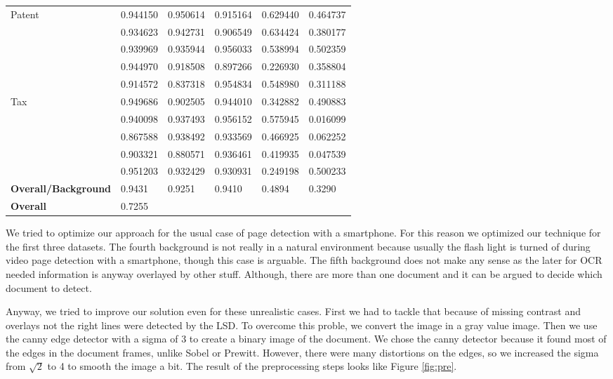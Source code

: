 \documentclass[english, paper=a4]{scrartcl}
\begin{document}
\begin{table*}[]
\begin{tabular}{l | p{2cm}| p{2cm}| p{2cm}| p{2cm}| p{2cm} }
Patent & 0.944150 & 0.950614  &0.915164 &0.629440 &0.464737  \\   
		& 0.934623 & 0.942731  &0.906549 &0.634424 &0.380177  \\ 
		& 0.939969 & 0.935944  &0.956033 &0.538994 &0.502359  \\ 
		& 0.944970 & 0.918508  &0.897266 &0.226930 &0.358804  \\ 
		& 0.914572 & 0.837318  &0.954834 &0.548980 &0.311188  \\ \hline 
Tax & 0.949686 & 0.902505  &0.944010 &0.342882 &0.490883  \\   
		& 0.940098 & 0.937493  &0.956152 &0.575945 &0.016099  \\ 
		& 0.867588 & 0.938492  &0.933569 &0.466925 &0.062252  \\ 
		& 0.903321 & 0.880571  &0.936461 &0.419935 &0.047539  \\ 
		& 0.951203 & 0.932429  &0.930931 &0.249198 &0.500233  \\ 	\hline \hline 
\textbf{Overall/Background} &0.9431 & 0.9251 & 0.9410 & 0.4894 &0.3290\\ \hline 
\textbf{Overall}&	 0.7255					            
\end{tabular}
\label{tab:results}
\end{table*}

We tried to optimize our approach for the usual case of page detection
with a smartphone. For this reason we optimized our technique for the first three
datasets. 
The fourth background is not really in a natural environment because usually 
the flash light is turned of during video page detection with a smartphone,
though this case is arguable. 
The fifth background does not make any sense as the later for OCR needed
information is anyway overlayed by other stuff. Although, there are more
than one document and it can be argued to decide which document to detect.

Anyway, we tried to improve our solution even for these unrealistic cases.
First we had to tackle that because of missing contrast and overlays not the 
right lines were detected by the LSD.
To overcome this proble, we convert the image in a gray value image. Then we use the canny edge detector with a sigma of 3 to create a binary image of the document. We chose the canny detector because it found most of the edges in the document frames, unlike Sobel or Prewitt. However, there were many distortions on the edges, so we increased the sigma from $\sqrt{2}$ to 4 to smooth the image a bit. The result of the preprocessing steps looks like Figure \ref{fig:pre}.
\end{document}
